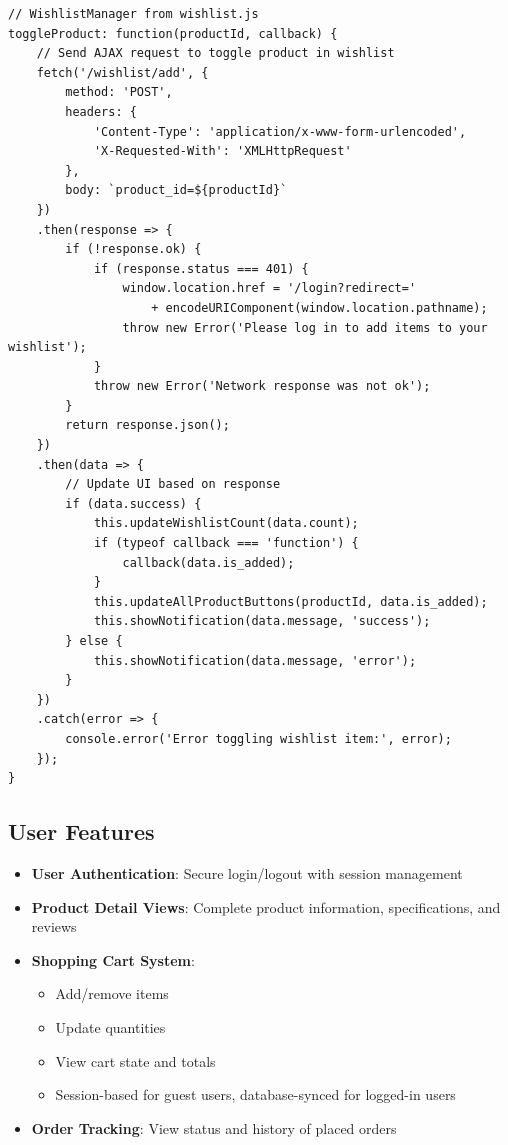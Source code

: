 \documentclass{article}
\begin{document}
\begin{lstlisting}[caption=Wishlist toggle functionality]
// WishlistManager from wishlist.js
toggleProduct: function(productId, callback) {
    // Send AJAX request to toggle product in wishlist
    fetch('/wishlist/add', {
        method: 'POST',
        headers: {
            'Content-Type': 'application/x-www-form-urlencoded',
            'X-Requested-With': 'XMLHttpRequest'
        },
        body: `product_id=${productId}`
    })
    .then(response => {
        if (!response.ok) {
            if (response.status === 401) {
                window.location.href = '/login?redirect=' 
                    + encodeURIComponent(window.location.pathname);
                throw new Error('Please log in to add items to your wishlist');
            }
            throw new Error('Network response was not ok');
        }
        return response.json();
    })
    .then(data => {
        // Update UI based on response
        if (data.success) {
            this.updateWishlistCount(data.count);
            if (typeof callback === 'function') {
                callback(data.is_added);
            }
            this.updateAllProductButtons(productId, data.is_added);
            this.showNotification(data.message, 'success');
        } else {
            this.showNotification(data.message, 'error');
        }
    })
    .catch(error => {
        console.error('Error toggling wishlist item:', error);
    });
}
\end{lstlisting}

\subsection{User Features}
\begin{itemize}
    \item \textbf{User Authentication}: Secure login/logout with session management
    \item \textbf{Product Detail Views}: Complete product information, specifications, and reviews
    \item \textbf{Shopping Cart System}:
        \begin{itemize}
            \item Add/remove items
            \item Update quantities
            \item View cart state and totals
            \item Session-based for guest users, database-synced for logged-in users
        \end{itemize}
    \item \textbf{Order Tracking}: View status and history of placed orders
\end{itemize}
\end{document}
